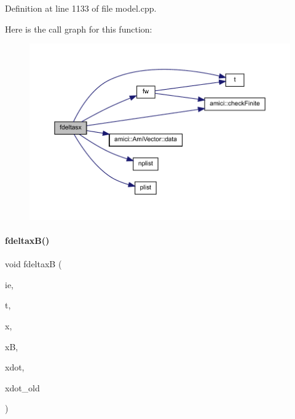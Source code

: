 Definition at line 1133 of file model.\+cpp.

Here is the call graph for this function\+:
\nopagebreak
\begin{figure}[H]
\begin{center}
\leavevmode
\includegraphics[width=350pt]{classamici_1_1_model_a685b7374d29d96f7d40d83c7d92fcf27_cgraph}
\end{center}
\end{figure}
\mbox{\label{classamici_1_1_model_a5542077fa03103e502349d92dc95f33a}} 
\paragraph{\texorpdfstring{fdeltaxB()}{fdeltaxB()}\hspace{0.1cm}{\footnotesize\ttfamily [1/2]}}
{\footnotesize\ttfamily void fdeltaxB (\begin{DoxyParamCaption}\item[{const int}]{ie,  }\item[{const \mbox{\hyperlink{namespaceamici_a1bdce28051d6a53868f7ccbf5f2c14a3}{realtype}}}]{t,  }\item[{const \mbox{\hyperlink{classamici_1_1_ami_vector}{Ami\+Vector}} $\ast$}]{x,  }\item[{const \mbox{\hyperlink{classamici_1_1_ami_vector}{Ami\+Vector}} $\ast$}]{xB,  }\item[{const \mbox{\hyperlink{classamici_1_1_ami_vector}{Ami\+Vector}} $\ast$}]{xdot,  }\item[{const \mbox{\hyperlink{classamici_1_1_ami_vector}{Ami\+Vector}} $\ast$}]{xdot\+\_\+old }\end{DoxyParamCaption})}

